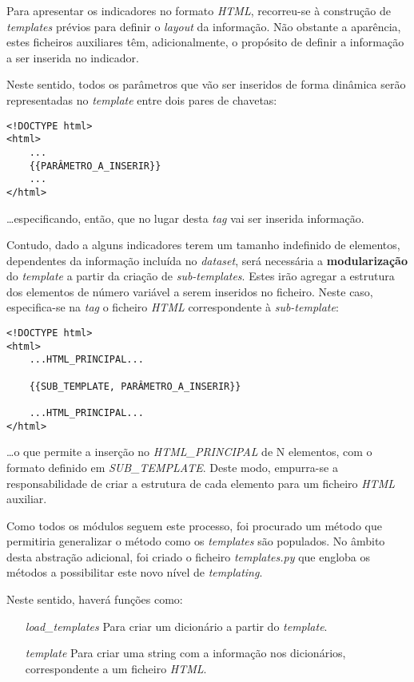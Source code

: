Para apresentar os indicadores no formato \textit{HTML}, recorreu-se à construção de \textit{templates} prévios
para definir o \textit{layout} da informação.
Não obstante a aparência, estes ficheiros auxiliares têm, adicionalmente, o propósito de definir a 
informação a ser inserida no indicador.

Neste sentido, todos os parâmetros que vão ser inseridos de forma dinâmica serão representadas no \textit{template} entre dois pares de
chavetas: 
\begin{verbatim}
<!DOCTYPE html>
<html>
    ...
    {{PARÂMETRO_A_INSERIR}}
    ...
</html>
\end{verbatim}

\dots especificando, então, que no lugar desta \textit{tag} vai ser inserida informação.

Contudo, dado a alguns indicadores terem um tamanho indefinido de elementos, dependentes da informação incluída no \textit{dataset}, será necessária a \textbf{modularização} 
do \textit{template} a partir da criação de \textit{sub-templates}.
Estes irão agregar a estrutura dos elementos de número variável a serem inseridos no ficheiro.
Neste caso, especifica-se na \textit{tag} o ficheiro \textit{HTML} correspondente à \textit{sub-template}:
\begin{verbatim}
<!DOCTYPE html>
<html>
    ...HTML_PRINCIPAL...

    {{SUB_TEMPLATE, PARÂMETRO_A_INSERIR}}

    ...HTML_PRINCIPAL...
</html>
\end{verbatim}

\dots o que permite a inserção no \textit{HTML_PRINCIPAL} de N elementos, com o formato definido em \textit{SUB_TEMPLATE}.
Deste modo, empurra-se a responsabilidade de criar a estrutura de cada elemento para um ficheiro \textit{HTML} auxiliar.

Como todos os módulos seguem este processo, foi procurado um método que permitiria generalizar o método como os \textit{templates} são populados.
No âmbito desta abstração adicional, foi criado o ficheiro \textit{templates.py} que engloba os métodos a possibilitar este novo nível de \textit{templating}.

Neste sentido, haverá funções como:
\begin{itemize}
    \item[\textit{load_templates}]Para criar um dicionário a partir do \textit{template}.
    \item[\textit{template}]Para criar uma string com a informação nos dicionários, correspondente a um ficheiro \textit{HTML}.
\end{itemize}

